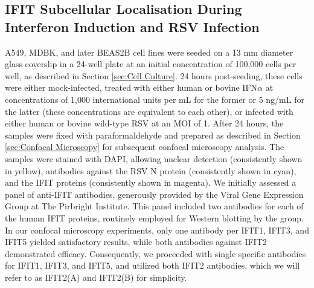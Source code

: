 \subsection{IFIT Subcellular Localisation During Interferon Induction and RSV Infection} \label{subsec:IFIT Subcellular Localisation During Interferon Induction and RSV Infection}
A549, MDBK, and later BEAS2B cell lines were seeded on a 13 mm diameter glass coverslip in a 24-well plate at an initial concentration of 100,000 cells per well, as described in Section \ref{sec:Cell Culture}. 24 hours post-seeding, these cells were either mock-infected, treated with either human or bovine IFN\(\alpha\) at concentrations of 1,000 international units per mL for the former or 5 ng/mL for the latter (these concentrations are equivalent to each other), or infected with either human or bovine wild-type RSV at an MOI of 1. After 24 hours, the samples were fixed with paraformaldehyde and prepared as described in Section \ref{sec:Confocal Microscopy} for subsequent confocal microscopy analysis. The samples were stained with DAPI, allowing nuclear detection (consistently shown in yellow), antibodies against the RSV N protein (consistently shown in cyan), and the IFIT proteins (consistently shown in magenta). We initially assessed a panel of anti-IFIT antibodies, generously provided by the Viral Gene Expression Group at The Pirbright Institute. This panel included two antibodies for each of the human IFIT proteins, routinely employed for Western blotting by the group. In our confocal microscopy experiments, only one antibody per IFIT1, IFIT3, and IFIT5 yielded satisfactory results, while both antibodies against IFIT2 demonstrated efficacy. Consequently, we proceeded with single specific antibodies for IFIT1, IFIT3, and IFIT5, and utilized both IFIT2 antibodies, which we will refer to as IFIT2(A) and IFIT2(B) for simplicity.

